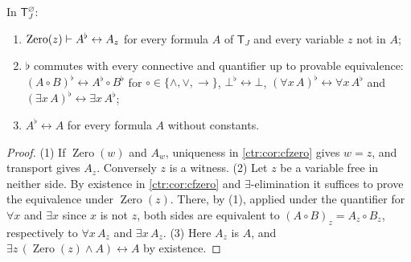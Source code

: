 \begin{lemma}\label{ctr:lem:cfflat}
In $\mathsf T_J^{\varnothing}$:
\begin{enumerate}
\item $\operatorname{Zero}(z)\vdash A^\flat\leftrightarrow A_z$ for every formula $A$ of
$\mathsf T_J$ and every variable $z$ not in $A$;
\item $\flat$ commutes with every connective and quantifier up to provable equivalence:
$(A\circ B)^\flat\leftrightarrow A^\flat\circ B^\flat$ for $\circ\in\{\land,\lor,\to\}$,
$\bot^\flat\leftrightarrow\bot$, $(\forall x\,A)^\flat\leftrightarrow\forall x\,A^\flat$ and
$(\exists x\,A)^\flat\leftrightarrow\exists x\,A^\flat$;
\item $A^\flat\leftrightarrow A$ for every formula $A$ without constants.
\end{enumerate}
\end{lemma}
\begin{proof}
(1) If $\operatorname{Zero}(w)$ and $A_w$, uniqueness in \cref{ctr:cor:cfzero} gives $w=z$,
and transport gives $A_z$. Conversely $z$ is a witness. (2) Let $z$ be a variable free in
neither side. By existence in \cref{ctr:cor:cfzero} and $\exists$-elimination it
suffices to prove the equivalence under $\operatorname{Zero}(z)$. There,
by (1), applied under the quantifier for $\forall x$ and $\exists x$ since $x$ is not $z$,
both sides are equivalent to $(A\circ B)_z=A_z\circ B_z$, respectively to
$\forall x\,A_z$ and $\exists x\,A_z$. (3) Here $A_z$ is $A$, and
$\exists z\,(\operatorname{Zero}(z)\land A)\leftrightarrow A$ by existence.
\end{proof}


